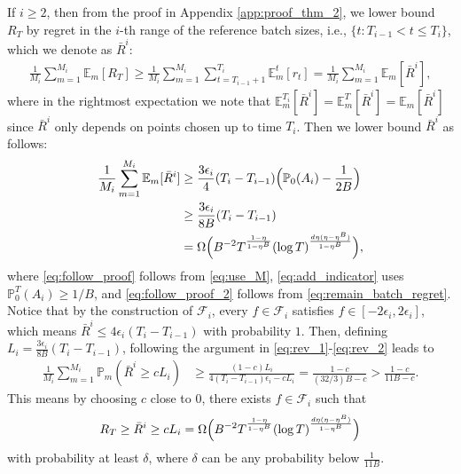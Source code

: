 \documentclass[10pt]{article}
\begin{document}
If $i\geq 2$, then from the proof in Appendix \ref{app:proof_thm_2}, we lower bound $R_T$ by regret in the $i$-th range of the reference batch sizes, i.e., $\{t:T_{i-1}<t\leq T_i\} $, which we denote as $\bar{R}^i$:
\begin{align}
    \frac{1}{M_i}\sum_{m=1}^{M_i}\mathbb{E}_m[R_T]
    \geq \frac{1}{M_i}\sum_{m=1}^{M_i}\sum_{t=T_{i-1}+1}^{T_i}\mathbb{E}_m^t[r_t]
    = \frac{1}{M_i}\sum_{m=1}^{M_i} \mathbb{E}_m[\bar{R}^i],
\end{align}
where in the rightmost expectation we note that  $\mathbb{E}^{T_i}_m[\bar{R}^i] = \mathbb{E}^T_m[\bar{R}^i] = \mathbb{E}_m[\bar{R}^i]$ since $\bar{R}^i$ only depends on points chosen up to time $T_i$. 
Then we lower bound $\bar{R}^i$ as follows:
\begin{align}
    \frac{1}{M_i}\sum_{m=1}^{M_i} \mathbb{E}_m[\bar{R}^i]
    & \geq \frac{3\epsilon_i}{4}(T_i-T_{i-1}) \Bigl(\mathbb{P}_0(A_i)- \frac{1}{2B} \Bigr) \label{eq:follow_proof} \\
    & \geq \frac{3\epsilon_i}{8B}(T_i-T_{i-1}) \label{eq:add_indicator} \\
    & = \Omega\Bigl(B^{-2}T^{\frac{1-\eta}{1-\eta^B}}(\log T)^{\frac{d\eta(\eta-\eta^B)}{1-\eta^B}} \Bigr), \label{eq:follow_proof_2}
\end{align}
where \eqref{eq:follow_proof} follows from \eqref{eq:use_M}, \eqref{eq:add_indicator} uses $\mathbb{P}_0^T(A_i) \geq 1/B$, and \eqref{eq:follow_proof_2} follows from \eqref{eq:remain_batch_regret}.
Notice that by the construction of $\mathcal{F}_i$, every $f\in \mathcal{F}_i$ satisfies $f\in[-2\epsilon_i, 2\epsilon_i]$, which means $\bar{R}^i \leq 4\epsilon_i(T_i-T_{i-1})$ with probability $1$.
Then, defining $L_i = \frac{3\epsilon_i}{8B}(T_i-T_{i-1})$, following the argument in \eqref{eq:rev_1}-\eqref{eq:rev_2} leads to
\begin{align}
    \frac{1}{M_i}\sum_{m=1}^{M_i}\mathbb{P}_m(\bar{R}^i\geq cL_i)
    & \geq \frac{(1-c)L_i}{4(T_i-T_{i-1})\epsilon_i-cL_i}
    = \frac{1-c}{(32/3)B-c}
    > \frac{1-c}{11B-c}.
\end{align}
This means by choosing $c$ close to $0$, there exists $f\in\mathcal{F}_i$ such that
\begin{align}
    R_T
    \geq \bar{R}^i
    \geq cL_i
    = \Omega\Bigl(B^{-2}T^{\frac{1-\eta}{1-\eta^B}}(\log T)^{\frac{d\eta(\eta-\eta^B)}{1-\eta^B}} \Bigr)
\end{align}
with probability at least $\delta$, where $\delta$ can be any probability below $\frac{1}{11B}$.
\end{document}
